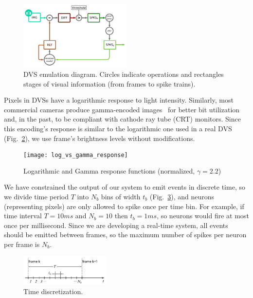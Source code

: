 \documentclass[conference]{IEEEtran}
\begin{document}
\begin{figure}[htb]
  \centering
  \includegraphics[width=0.5\textwidth]{dvs_emu}
  \caption{DVS emulation diagram. Circles indicate operations and rectangles stages of visual information (from frames to spike trains).}
  \label{fig:dvs_emu}
\end{figure}

Pixels in DVSs have a logarithmic response to light intensity. Similarly, most commercial cameras produce gamma-encoded images~\cite{PoyntonDigitalVideo} for better bit utilization and, in the past, to be compliant with cathode ray tube (CRT) monitors. Since this encoding's response is similar to the logarithmic one used in a real DVS (Fig.~\ref{fig:gamma_coding}), we use frame's brightness levels without modifications.
\begin{figure}[htb]
  \centering
  \texttt{[image: log\_vs\_gamma\_response]}
  \caption{Logarithmic and Gamma response functions (normalized, $\gamma = 2.2$)}
  \label{fig:gamma_coding}
\end{figure}



We have constrained the output of our system to emit events in discrete time, so we divide time period $T$ into $N_{b}$ bins of width $t_{b}$ (Fig.~\ref{fig:time_bins}), and neurons (representing pixels) are only allowed to spike once per time bin. For example, if time interval $T = 10 ms$ and $N_{b} = 10$ then $t_{b} = 1 ms$, so neurons would fire at most once per millisecond. Since we are developing a real-time system, all events should be emitted between frames, so the maximum number of spikes per neuron per frame is $N_{b}$.

\begin{figure}[hbt]
  \centering
  \includegraphics[width=0.4\textwidth]{discrete_time_bins}
  \caption{Time discretization.}
  \label{fig:time_bins}
\end{figure}
\end{document}
